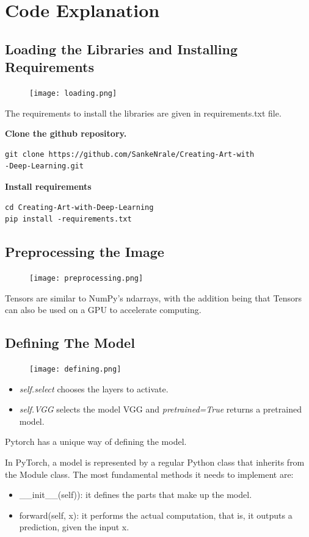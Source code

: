 \documentclass[oneside]{book}
\begin{document}
\chapter*{Code Explanation}
\section*{Loading the Libraries and Installing Requirements}
\begin{figure}[h]
\centering
\centerline{\texttt{[image: loading.png]}}
\end{figure}

The requirements to install the libraries are given in
requirements.txt file.

\textbf{Clone the github repository.}
\begin{lstlisting} 
git clone https://github.com/SankeNrale/Creating-Art-with
-Deep-Learning.git
\end{lstlisting}

\textbf{Install requirements} 
\begin{lstlisting} 
cd Creating-Art-with-Deep-Learning 
pip install -requirements.txt
\end{lstlisting}
\pagebreak
\section*{Preprocessing the Image}
\begin{figure}[h]
\centering
\centerline{\texttt{[image: preprocessing.png]}}
\end{figure}
Tensors are similar to NumPy’s ndarrays, with the addition being that Tensors can also be used on a GPU to accelerate computing.
\section*{Defining The Model}
\begin{figure}[h]
\centering
\centerline{\texttt{[image: defining.png]}}
\end{figure}
\begin{itemize}
\item \emph{self.select} chooses the layers to activate. 
\item \emph{self.VGG} selects the model VGG and \emph{pretrained=True} returns a pretrained model.
\end{itemize} 
\pagebreak
Pytorch has a unique way of defining the model.

In PyTorch, a model is represented by a regular Python class that inherits from the Module class.
The most fundamental methods it needs to implement are:\linebreak
\begin{itemize}
\item \_\_init\_\_(self)): it defines the parts that make up the model.

\item forward(self, x): it performs the actual computation, that is, it outputs a prediction, given the input x.
\end{itemize}
\end{document}
